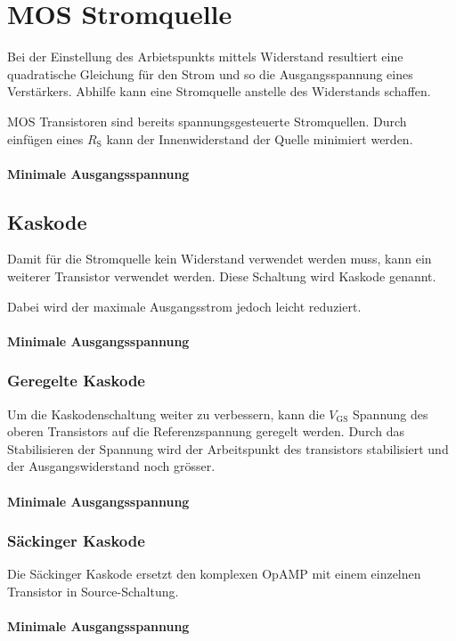\section{MOS Stromquelle}
Bei der Einstellung des Arbietspunkts mittels Widerstand resultiert eine quadratische Gleichung für den Strom und so die Ausgangsspannung eines Verstärkers.
Abhilfe kann eine Stromquelle anstelle des Widerstands schaffen.

MOS Transistoren sind bereits spannungsgesteuerte Stromquellen.
Durch einfügen eines $R_\text{S}$ kann der Innenwiderstand der Quelle minimiert werden.

\paragraph{Minimale Ausgangsspannung}

\subsection{Kaskode}
Damit für die Stromquelle kein Widerstand verwendet werden muss, kann ein weiterer Transistor verwendet werden. Diese Schaltung wird Kaskode genannt.

Dabei wird der maximale Ausgangsstrom jedoch leicht reduziert.

\paragraph{Minimale Ausgangsspannung}

\subsubsection{Geregelte Kaskode}
Um die Kaskodenschaltung weiter zu verbessern, kann die $V_\text{GS}$ Spannung des oberen Transistors auf die Referenzspannung geregelt werden.
Durch das Stabilisieren der Spannung wird der Arbeitspunkt des transistors stabilisiert und der Ausgangswiderstand noch grösser.

\paragraph{Minimale Ausgangsspannung}

\subsubsection{Säckinger Kaskode}
Die Säckinger Kaskode ersetzt den komplexen OpAMP mit einem einzelnen Transistor in Source-Schaltung.

\paragraph{Minimale Ausgangsspannung}
